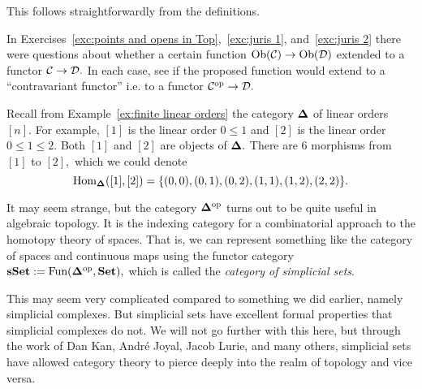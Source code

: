\documentclass[CT4S-EN-RU]{subfiles}
\begin{document}
\begin{lemmaRUS}
\end{lemmaRUS}

\begin{proofENG}
This follows straightforwardly from the definitions.
\end{proofENG}

\begin{proofRUS}
\end{proofRUS}

\begin{exerciseENG}
In Exercises~\ref{exc:points and opens in Top},~\ref{exc:juris 1}, and~\ref{exc:juris 2} there were questions about whether a certain function $\textnormal{Ob}(\mathcal{C})\rightarrow\textnormal{Ob}(\mathcal{D})$ extended to a functor $\mathcal{C}\rightarrow\mathcal{D}.$ In each case, see if the proposed function would extend to a “contravariant functor” i.e. to a functor $\mathcal{C}^\textnormal{op}\rightarrow\mathcal{D}.$
\end{exerciseENG}

\begin{exerciseRUS}
\end{exerciseRUS}

\begin{exampleENG}\label{ex:simplicial set}
Recall from Example~\ref{ex:finite linear orders} the category ${\mathbf{\Delta}}$ of linear orders $[n].$ For example, $[1]$ is the linear order $0\leq 1$ and $[2]$ is the linear order $0\leq 1\leq2.$ Both $[1]$ and $[2]$ are objects of ${\mathbf{\Delta}}.$ There are 6 morphisms from $[1]$ to $[2],$ which we could denote $$\textnormal{Hom}_{{\mathbf{\Delta}}}([1],[2])=\{(0,0), (0,1), (0,2), (1,1), (1,2), (2,2)\}.$$

It may seem strange, but the category ${\mathbf{\Delta}}^\textnormal{op}$ turns out to be quite useful in algebraic topology. It is the indexing category for a combinatorial approach to the homotopy theory of spaces. That is, we can represent something like the category of spaces and continuous maps using the functor category ${\mathbf{sSet}}:=\textnormal{Fun}({\mathbf{\Delta}}^\textnormal{op},{\mathbf{Set}}),$ which is called the {\em category of simplicial sets}. 

This may seem very complicated compared to something we did earlier, namely simplicial complexes. But simplicial sets have excellent formal properties that simplicial complexes do not. We will not go further with this here, but through the work of Dan Kan, Andr\'{e} Joyal, Jacob Lurie, and many others, simplicial sets have allowed category theory to pierce deeply into the realm of topology and vice versa.
\end{exampleENG}
\end{document}
